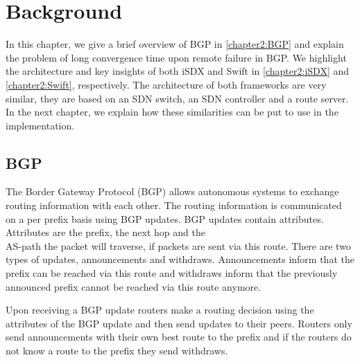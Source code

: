 
\chapter{\label{chapter2}Background}

In this chapter, we give a brief overview of BGP in \ref{chapter2:BGP} and explain the problem of long convergence time upon remote failure in BGP. We highlight the architecture and key insights of both iSDX and Swift in \ref{chapter2:iSDX} and \ref{chapter2:Swift}, respectively. The architecture of both frameworks are very similar, they are based on an SDN switch, an SDN controller and a route server. In the next chapter, we explain how these similarities can be put to use in the implementation.

\section{\label{chapter2:BGP}BGP}

The Border Gateway Protocol (BGP) allows autonomous systems to exchange routing information with each other. The routing information is communicated on a per prefix basis using BGP updates. BGP updates contain attributes. Attributes are the prefix, the next hop and the \\
AS-path the packet will traverse, if packets are sent via this route. There are two types of updates, announcements and withdraws. Announcements inform that the prefix can be reached via this route and withdraws inform that the previously announced prefix cannot be reached via this route anymore. 

Upon receiving a BGP update routers make a routing decision using the attributes of the BGP update and then send updates to their peers. Routers only send announcements with their own best route to the prefix and if the routers do not know a route to the prefix they send withdraws.


